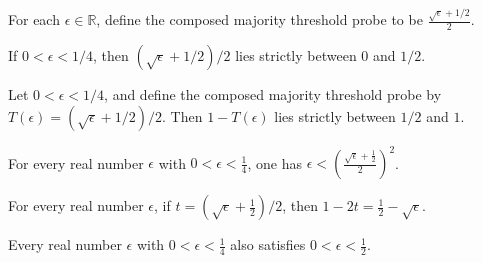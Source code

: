 \begin{definition}
\label{FABL.composedMajorityThresholdProbe}
\leanok
For each $\epsilon\in\mathbb R$, define the composed majority threshold probe to be
$\frac{\sqrt{\epsilon}+1/2}{2}$.
\end{definition}

\begin{theorem}
\label{FABL.composedMajorityThresholdProbe_mem_Ioo}
\leanok
{}
If $0<\epsilon<1/4$, then $(\sqrt{\epsilon}+1/2)/2$ lies strictly between $0$ and $1/2$.
\end{theorem}

\begin{theorem}
\label{FABL.one_sub_composedMajorityThresholdProbe_mem_Ioo}
\leanok
{}
Let $0<\epsilon<1/4$, and define the composed majority threshold probe by
$T(\epsilon)=(\sqrt{\epsilon}+1/2)/2$. Then $1-T(\epsilon)$ lies strictly between $1/2$
and $1$.
\end{theorem}

\begin{theorem}
\label{FABL.epsilon_lt_composedMajorityThresholdProbe_sq}
\leanok
{}
For every real number $\epsilon$ with $0<\epsilon<\tfrac14$, one has
$\epsilon<\left(\frac{\sqrt{\epsilon}+\tfrac12}{2}\right)^2$.
\end{theorem}

\begin{theorem}
\label{FABL.one_sub_two_mul_composedMajorityThresholdProbe}
\leanok
{}
For every real number $\epsilon$, if $t=(\sqrt{\epsilon}+\frac12)/2$, then
$1-2t=\frac12-\sqrt{\epsilon}$.
\end{theorem}

\begin{theorem}
\label{FABL.epsilon_mem_Ioo_half_of_mem_Ioo_quarter}
\leanok
{}
Every real number $\epsilon$ with $0<\epsilon<\tfrac14$ also satisfies
$0<\epsilon<\tfrac12$.
\end{theorem}


